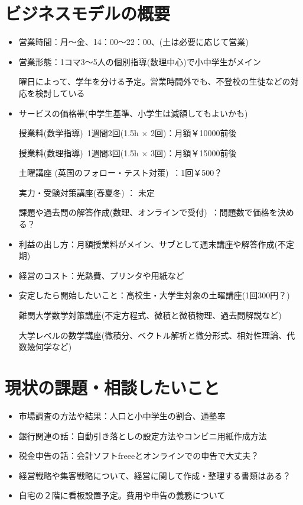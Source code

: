 ﻿\documentclass[12pt]{article}
\begin{document}
\section{ビジネスモデルの概要}
\begin{itemize}[leftmargin=1.5em, itemsep=3mm, parsep=5pt]
  \item 営業時間：月～金、14：00～22：00、(土は必要に応じて営業)
  \item 営業形態：1コマ3～5人の個別指導(数理中心)で小中学生がメイン
  
  曜日によって、学年を分ける予定。営業時間外でも、不登校の生徒などの対応を検討している
  
  \item サービスの価格帯(中学生基準、小学生は減額してもよいかも) %
  
  授業料(数学指導)\ 1週間2回(1.5h $\times$ 2回)：月額￥10000前後
  
  授業料(数理指導)\ 1週間3回(1.5h $\times$ 3回)：月額￥15000前後
  
  土曜講座 (英国のフォロー・テスト対策)\ ：1回￥500？
  
  実力・受験対策講座(春夏冬) ： 未定
  
  課題や過去問の解答作成(数理、オンラインで受付)\ ：問題数で価格を決める？
  
  \item 利益の出し方：月額授業料がメイン、サブとして週末講座や解答作成(不定期)
  \item 経営のコスト：光熱費、プリンタや用紙など
  \item 安定したら開始したいこと：高校生・大学生対象の土曜講座(1回300円？)
  
  難関大学数学対策講座(不定方程式、微積と微積物理、過去問解説など)
  
  大学レベルの数学講座(微積分、ベクトル解析と微分形式、相対性理論、代数幾何学など)
\end{itemize}


\section{現状の課題・相談したいこと}
\begin{itemize}[leftmargin=1.5em]
  \item 市場調査の方法や結果：人口と小中学生の割合、通塾率
  \item 銀行関連の話：自動引き落としの設定方法やコンビニ用紙作成方法
  \item 税金申告の話：会計ソフトfreeeとオンラインでの申告で大丈夫？
  \item 経営戦略や集客戦略について、経営に関して作成・整理する書類はある？
  \item 自宅の２階に看板設置予定。費用や申告の義務について
\end{itemize}
\end{document}

